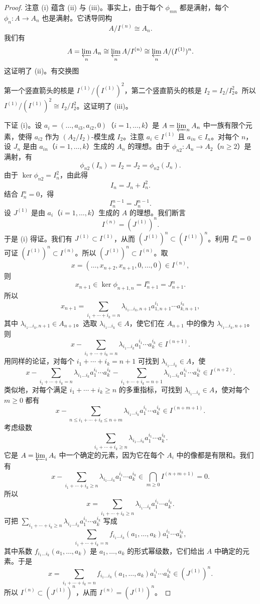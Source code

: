 \begin{proof}
注意 (i) 蕴含 (ii) 与 (iii)。事实上，由于每个 $\phi_{mn}$ 都是满射，每个 $\phi_n\colon A\to A_n$ 也是满射。它诱导同构
\[
A/I^{(n)}\cong A_n.
\]
我们有
\[
A=\varprojlim_n A_n\cong\varprojlim_n A/I^{(n)}\cong\varprojlim_n A/(I^{(1)})^n.
\]
这证明了 (ii)。有交换图
\begin{center}
\end{center}
第一个竖直箭头的核是 $I^{(1)}/(I^{(1)})^2$，第二个竖直箭头的核是 $I_2=I_2/I_2^2$。所以 $I^{(1)}/(I^{(1)})^2\cong I_2/I_2^2$。这证明了 (iii)。

下证 (i)。设 $a_i=(\dots,a_{i3},a_{i2},0)$（$i=1,\dots,k$）是 $A=\varprojlim_n A_n$ 中一族有限个元素，使得 $a_{i2}$ 作为 $(A_2/I_2)$-模生成 $I_2$。注意 $a_i\in I^{(1)}$ 且 $a_{in}\in I_n$。对每个 $n$，设 $J_n$ 是由 $a_{in}$（$i=1,\dots,k$）生成的 $A_n$ 的理想。由于 $\phi_{n2}\colon A_n\to A_2$（$n\ge 2$）是满射，有
\[
\phi_{n2}(I_n)=I_2=J_2=\phi_{n2}(J_n).
\]
由于 $\ker\phi_{n2}=I_n^2$，由此得
\[
I_n=J_n+I_n^2.
\]
结合 $I_n^n=0$，得
\[
I_n^{n-1}=J_n^{n-1}.
\]
设 $J^{(1)}$ 是由 $a_i$（$i=1,\dots,k$）生成的 $A$ 的理想。我们断言
\[
I^{(n)}=(J^{(1)})^n.
\]
于是 (i) 得证。我们有 $J^{(1)}\subset I^{(1)}$，从而 $(J^{(1)})^n\subset(I^{(1)})^n$。利用 $I_n^n=0$ 可证 $(I^{(1)})^n\subset I^{(n)}$。所以 $(J^{(1)})^n\subset I^{(n)}$。取
\[
x=(\dots,x_{n+2},x_{n+1},0,\dots,0)\in I^{(n)},
\]
则
\[
x_{n+1}\in\ker\phi_{n+1,n}=I_{n+1}^n=J_{n+1}^n.
\]
所以
\[
x_{n+1}=\sum_{i_1+\cdots+i_k=n}\lambda_{i_1\dots i_k,n+1}a_{1,n+1}^{i_1}\cdots a_{k,n+1}^{i_k},
\]
其中 $\lambda_{i_1\dots i_k,n+1}\in A_{n+1}$。选取 $\lambda_{i_1\dots i_k}\in A$，使它们在 $A_{n+1}$ 中的像为 $\lambda_{i_1\dots i_k,n+1}$。则
\[
x-\sum_{i_1+\cdots+i_k=n}\lambda_{i_1\dots i_k}a_1^{i_1}\cdots a_k^{i_k}\in I^{(n+1)}.
\]
用同样的论证，对每个 $i_1+\cdots+i_k=n+1$ 可找到 $\lambda_{i_1\dots i_k}\in A$，使
\[
x-\sum_{i_1+\cdots+i_k=n}\lambda_{i_1\dots i_k}a_1^{i_1}\cdots a_k^{i_k}
-\sum_{i_1+\cdots+i_k=n+1}\lambda_{i_1\dots i_k}a_1^{i_1}\cdots a_k^{i_k}\in I^{(n+2)}.
\]
类似地，对每个满足 $i_1+\cdots+i_k\ge n$ 的多重指标，可找到 $\lambda_{i_1\dots i_k}\in A$，使对每个 $m\ge 0$ 都有
\[
x-\sum_{n\le i_1+\cdots+i_k\le n+m}\lambda_{i_1\dots i_k}a_1^{i_1}\cdots a_k^{i_k}\in I^{(n+m+1)}.
\]
考虑级数
\[
\sum_{i_1+\cdots+i_k\ge n}\lambda_{i_1\dots i_k}a_1^{i_1}\cdots a_k^{i_k}.
\]
它是 $A=\varprojlim_i A_i$ 中一个确定的元素，因为它在每个 $A_i$ 中的像都是有限和。我们有
\[
x-\sum_{i_1+\cdots+i_k\ge n}\lambda_{i_1\dots i_k}a_1^{i_1}\cdots a_k^{i_k}\in\bigcap_{m\ge 0}I^{(n+m+1)}=0.
\]
所以
\[
x=\sum_{i_1+\cdots+i_k\ge n}\lambda_{i_1\dots i_k}a_1^{i_1}\cdots a_k^{i_k}.
\]
可把 $\sum_{i_1+\cdots+i_k\ge n}\lambda_{i_1\dots i_k}a_1^{i_1}\cdots a_k^{i_k}$ 写成
\[
\sum_{i_1+\cdots+i_k=n}f_{i_1\dots i_k}(a_1,\dots,a_k)a_1^{i_1}\cdots a_k^{i_k},
\]
其中系数 $f_{i_1\dots i_k}(a_1,\dots,a_k)$ 是 $a_1,\dots,a_k$ 的形式幂级数，它们给出 $A$ 中确定的元素。于是
\[
x=\sum_{i_1+\cdots+i_k=n}f_{i_1\dots i_k}(a_1,\dots,a_k)a_1^{i_1}\cdots a_k^{i_k}\in(J^{(1)})^n.
\]
所以 $I^{(n)}\subset(J^{(1)})^n$，从而 $I^{(n)}=(J^{(1)})^n$。
\end{proof}

